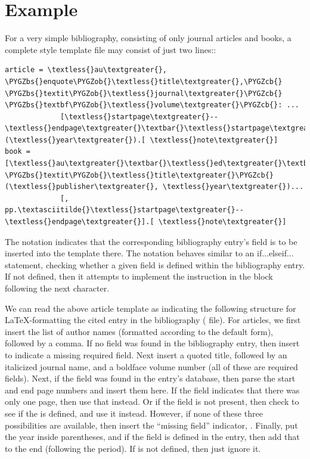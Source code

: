 \documentclass[letterpaper,10pt,english]{sphinxmanual}
\def\PYGZbs{\char`\\}
\def\PYGZob{\char`\{}
\def\PYGZcb{\char`\}}
\begin{document}
\section{Example}
\label{index:example}
For a very simple bibliography, consisting of only journal articles and books, a complete style template file may consist of just two lines::

\begin{Verbatim}[commandchars=\\\{\}]
article = \textless{}au\textgreater{}, \PYGZbs{}enquote\PYGZob{}\textless{}title\textgreater{},\PYGZcb{} \PYGZbs{}textit\PYGZob{}\textless{}journal\textgreater{}\PYGZcb{} \PYGZbs{}textbf\PYGZob{}\textless{}volume\textgreater{}\PYGZcb{}: ...
             [\textless{}startpage\textgreater{}--\textless{}endpage\textgreater{}\textbar{}\textless{}startpage\textgreater{}\textbar{}\textless{}eid\textgreater{}\textbar{}] (\textless{}year\textgreater{}).[ \textless{}note\textgreater{}]
book = [\textless{}au\textgreater{}\textbar{}\textless{}ed\textgreater{}\textbar{}], \PYGZbs{}textit\PYGZob{}\textless{}title\textgreater{}\PYGZcb{} (\textless{}publisher\textgreater{}, \textless{}year\textgreater{})...
             [, pp.\textasciitilde{}\textless{}startpage\textgreater{}--\textless{}endpage\textgreater{}].[ \textless{}note\textgreater{}]
\end{Verbatim}

The  notation indicates that the corresponding bibliography entry's field is to be inserted into the template there. The \code{{[}...\textbar{}...{]}} notation behaves similar to an if...elseif... statement, checking whether a given field is defined within the bibliography entry. If not defined, then it attempts to implement the instruction in the block following the next \code{\textbar{}} character.

We can read the above article template as indicating the following structure for LaTeX-formatting the cited entry in the bibliography ( file). For articles, we first insert the list of author names (formatted according to the default form), followed by a comma. If no  field was found in the bibliography entry, then insert  to indicate a missing required field. Next insert a quoted title, followed by an italicized journal name, and a boldface volume number (all of these are required fields). Next, if the  field was found in the entry's database, then parse the start and end page numbers and insert them here. If the  field indicates that there was only one page, then use that instead. Or if the  field is not present, then check to see if the  is defined, and use it instead. However, if none of these three possibilities are available, then insert the “missing field” indicator, . Finally, put the year inside parentheses, and if the  field is defined in the entry, then add that to the end (following the period). If  is not defined, then just ignore it.
\end{document}
